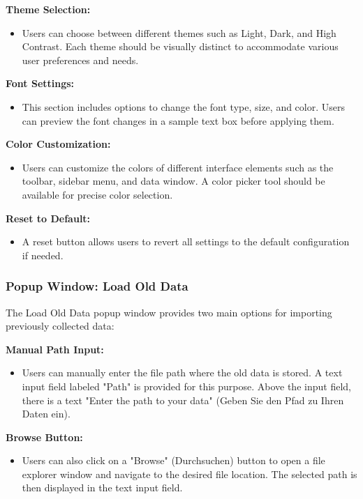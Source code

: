 \documentclass[]{scrreprt}
\begin{document}
\textbf{Theme Selection:}
\begin{itemize}
    \item Users can choose between different themes such as Light, Dark, and High Contrast. Each theme should be visually distinct to accommodate various user preferences and needs.
\end{itemize}

\textbf{Font Settings:}
\begin{itemize}
    \item This section includes options to change the font type, size, and color. Users can preview the font changes in a sample text box before applying them.
\end{itemize}

\textbf{Color Customization:}
\begin{itemize}
    \item Users can customize the colors of different interface elements such as the toolbar, sidebar menu, and data window. A color picker tool should be available for precise color selection.
\end{itemize}

\textbf{Reset to Default:}
\begin{itemize}
    \item A reset button allows users to revert all settings to the default configuration if needed.
\end{itemize}

\subsubsection{Popup Window: Load Old Data} \label{cap:PopupWindow_loadoldata}

The Load Old Data popup window provides two main options for importing previously collected data:

\textbf{Manual Path Input:}
\begin{itemize}
    \item Users can manually enter the file path where the old data is stored. A text input field labeled "Path" is provided for this purpose. Above the input field, there is a text "Enter the path to your data" (Geben Sie den Pfad zu Ihren Daten ein).
\end{itemize}

\textbf{Browse Button:}
\begin{itemize}
    \item Users can also click on a "Browse" (Durchsuchen) button to open a file explorer window and navigate to the desired file location. The selected path is then displayed in the text input field.
\end{itemize}
\end{document}
